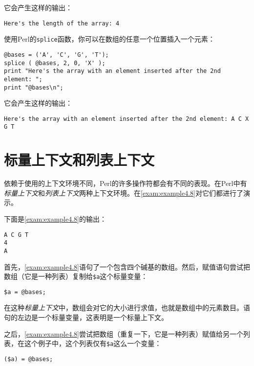 它会产生这样的输出：

\begin{lstlisting}
Here's the length of the array: 4
\end{lstlisting}

使用Perl的\verb|splice|函数，你可以在数组的任意一个位置插入一个元素：

\begin{lstlisting}
@bases = ('A', 'C', 'G', 'T');
splice ( @bases, 2, 0, 'X' );
print "Here's the array with an element inserted after the 2nd element: ";
print "@bases\n";
\end{lstlisting}

它会产生这样的输出：

\begin{lstlisting}
Here's the array with an element inserted after the 2nd element: A C X G T
\end{lstlisting}

\section{标量上下文和列表上下文}
依赖于使用的上下文环境不同，Perl的许多操作符都会有不同的表现。在Perl中有\textit{标量上下文}和\textit{列表上下文}两种上下文环境。在\autoref{exam:example4.8}对它们都进行了演示。



下面是\autoref{exam:example4.8}的输出：

\begin{lstlisting}
A C G T
4
A
\end{lstlisting}

首先，\autoref{exam:example4.8}语句了一个包含四个碱基的数组。然后，赋值语句尝试把数组（它是一种列表）复制给\verb|$a|这个标量变量： 

\begin{lstlisting}
$a = @bases;
\end{lstlisting}

在这种\textit{标量上下文}中，数组会对它的大小进行求值，也就是数组中的元素数目。语句的左边是一个标量变量，这表明是一个标量上下文。

之后，\autoref{exam:example4.8}尝试把数组（重复一下，它是一种列表）赋值给另一个列表，在这个例子中，这个列表仅有\verb|$a|这么一个变量：

\begin{lstlisting}
($a) = @bases;
\end{lstlisting}

